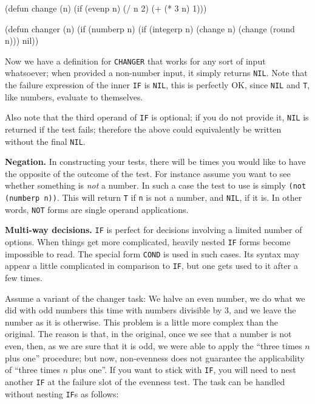 \documentclass[a4paper,11pt]{article}
\begin{document}
\begin{uenum}
\begin{uenumi}
\begin{lispcode}
(defun change (n)
  (if (evenp n)
    (/ n 2)
    (+ (* 3 n) 1)))

(defun changer (n)
  (if (numberp n)
    (if (integerp n)
      (change n)
      (change (round n)))
    nil))
\end{lispcode}

Now we have a definition for \Verb+CHANGER+ that works for any sort of input whatsoever; when provided a non-number input, it simply returns \Verb+NIL+.  Note that the failure expression of the inner \Verb+IF+ is \Verb+NIL+, this is perfectly OK, since \Verb+NIL+ and \Verb+T+, like numbers, evaluate to themselves.

\item Also note that the third operand of \Verb+IF+ is optional; if you do not provide it, \Verb+NIL+ is returned if the test fails; therefore the above could equivalently be written without the final \Verb+NIL+.
\end{uenumi}

\item {\bf Negation.} In constructing your tests, there will be times you would like to have the opposite of the outcome of the test. For instance assume you want to see whether something is \emph{not} a number. In such a case the test to use is simply \Verb+(not (numberp n))+. This will return \Verb+T+ if \Verb+n+ is not a number, and \Verb+NIL+, if it is. In other words, \Verb+NOT+ forms are single operand applications.

\item {\bf Multi-way decisions.} \Verb+IF+ is perfect for decisions involving a limited number of options. When things get more complicated, heavily nested \Verb+IF+ forms become impossible to read. The special form \Verb+COND+ is used in such cases. Its syntax may appear a little complicated in comparison to \Verb+IF+, but one gets used to it after a few times.

Assume a variant of the changer task: We halve an even number, we do what we did with odd numbers this time with numbers divisible by 3, and we leave the number as it is otherwise. This problem is a little more complex than the original. The reason is that, in the original, once we see that a number is not even, then, as we are sure that it is odd, we were able to apply the ``three times $n$ plus one'' procedure; but now, non-evenness does not guarantee the applicability of ``three times $n$ plus one''. If you want to stick with \Verb+IF+, you will need to nest another \Verb+IF+ at the failure slot of the evenness test. The task can be handled without nesting \Verb+IF+s as follows:


\end{uenum}
\end{document}
